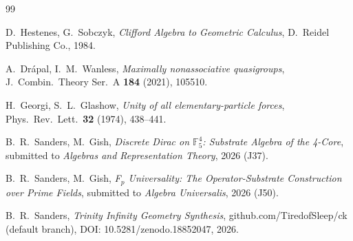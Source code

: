\documentclass[11pt,reqno]{amsart}
\theoremstyle{plain}
\theoremstyle{definition}
\theoremstyle{remark}
\newcommand{\F}{\mathbb{F}}
\begin{document}
\begin{thebibliography}{99}

 D.~Hestenes, G.~Sobczyk,
\emph{Clifford Algebra to Geometric Calculus},
D.~Reidel Publishing Co., 1984.

 A.~Dr\'apal, I.~M.~Wanless,
\emph{Maximally nonassociative quasigroups},
J.~Combin.~Theory Ser.~A \textbf{184} (2021), 105510.

 H.~Georgi, S.~L.~Glashow,
\emph{Unity of all elementary-particle forces},
Phys.~Rev.~Lett.~\textbf{32} (1974), 438--441.

 B.~R.~Sanders, M.~Gish,
\emph{Discrete Dirac on $\F_5^4$: Substrate Algebra of the 4-Core},
submitted to \emph{Algebras and Representation Theory}, 2026 (J37).

 B.~R.~Sanders, M.~Gish,
\emph{F$_p$ Universality: The Operator-Substrate Construction over
Prime Fields}, submitted to \emph{Algebra Universalis}, 2026 (J50).

 B.~R.~Sanders,
\emph{Trinity Infinity Geometry Synthesis},
github.com/TiredofSleep/ck (default branch),
DOI: 10.5281/zenodo.18852047, 2026.

\end{thebibliography}
\end{document}
